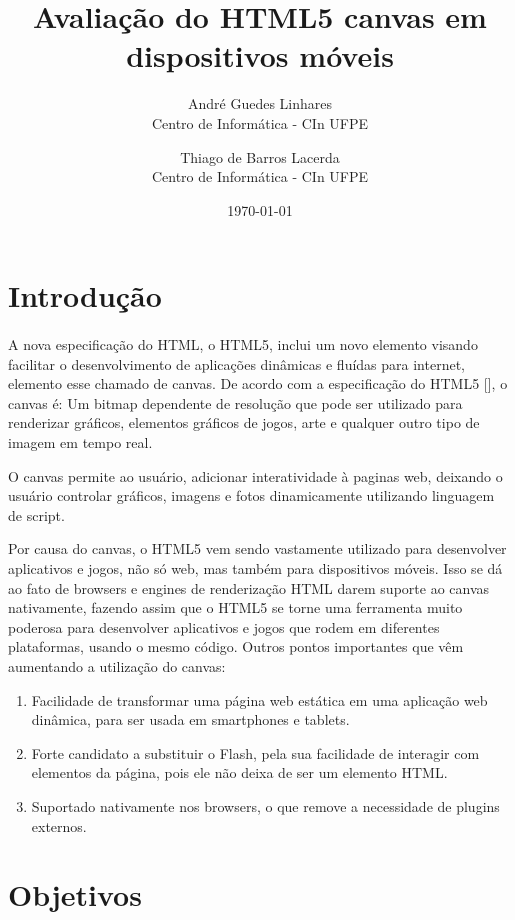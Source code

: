 \documentclass[11pt,a4paper]{article}
\title{Avaliação do HTML5 canvas em dispositivos móveis}
\author{
        André Guedes Linhares\\
        Centro de Informática - CIn UFPE\\
            \and
        Thiago de Barros Lacerda\\
        Centro de Informática - CIn UFPE\\
}
\date{\today}
\begin{document}
\maketitle

\section{Introdução}

\paragraph{}
A nova especificação do HTML, o HTML5, inclui um novo elemento visando facilitar o desenvolvimento de aplicações
dinâmicas e fluídas para internet, elemento esse chamado de canvas. De acordo com a especificação do HTML5 [], o canvas
é:
Um bitmap dependente de resolução que pode ser utilizado para renderizar gráficos, elementos gráficos de jogos, arte e
qualquer outro tipo de imagem em tempo real.

O canvas permite ao usuário, adicionar interatividade à paginas web, deixando o usuário controlar gráficos, imagens e
fotos dinamicamente utilizando linguagem de script.

Por causa do canvas, o HTML5 vem sendo vastamente utilizado para desenvolver aplicativos e jogos, não só web, mas também
para dispositivos móveis. Isso se dá ao fato de browsers e engines de renderização HTML darem suporte ao canvas
nativamente, fazendo assim que o HTML5 se torne uma ferramenta muito poderosa para desenvolver aplicativos e jogos que
rodem em diferentes plataformas, usando o mesmo código. Outros pontos importantes que vêm aumentando a utilização do
canvas:
\begin{enumerate}
    \item Facilidade de transformar uma página web estática em uma aplicação web dinâmica, para ser usada em smartphones
    e tablets.
    \item Forte candidato a substituir o Flash, pela sua facilidade de interagir com elementos da página, pois ele não
    deixa de ser um elemento HTML.
    \item Suportado nativamente nos browsers, o que remove a necessidade de plugins externos.
\end{enumerate}


\section{Objetivos}
\end{document}
